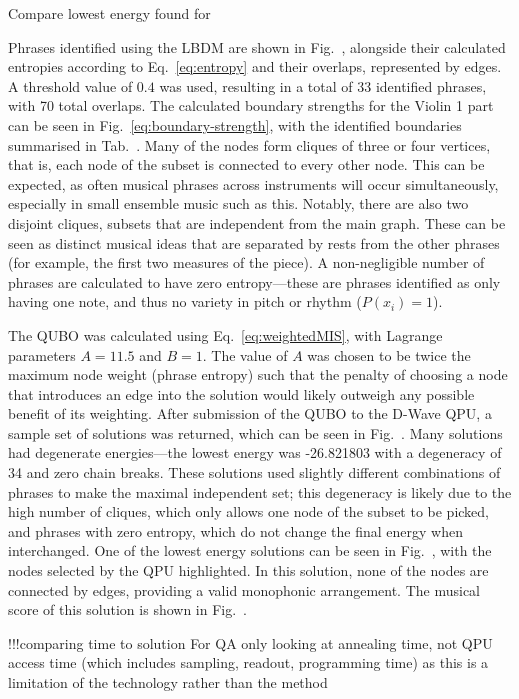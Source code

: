 \documentclass[12pt]{article}
\theoremstyle{definition}
\begin{document}
Compare lowest energy found for 

Phrases identified using the LBDM are shown in Fig.\  , alongside their calculated entropies according to Eq.\ \ref{eq:entropy} and their overlaps, represented by edges. A threshold value of $0.4$ was used, resulting in a total of 33 identified phrases, with 70 total overlaps. The calculated boundary strengths for the Violin 1 part can be seen in Fig.\ \ref{eq:boundary-strength}, with the identified boundaries summarised in Tab.\ . Many of the nodes form cliques of three or four vertices, that is, each node of the subset is connected to every other node. This can be expected, as often musical phrases across instruments will occur simultaneously, especially in small ensemble music such as this. Notably, there are also two disjoint cliques, subsets that are independent from the main graph. These can be seen as distinct musical ideas that are separated by rests from the other phrases (for example, the first two measures of the piece). A non-negligible number of phrases are calculated to have zero entropy—these are phrases identified as only having one note, and thus no variety in pitch or rhythm ($P(x_i)=1$).

The QUBO was calculated using Eq.\ \ref{eq:weightedMIS}, with Lagrange parameters $A=11.5$ and $B=1$. The value of $A$ was chosen to be twice the maximum node weight (phrase entropy) such that the penalty of choosing a node that introduces an edge into the solution would likely outweigh any possible benefit of its weighting. After submission of the QUBO to the D-Wave QPU, a sample set of solutions was returned, which can be seen in Fig.\  . Many solutions had degenerate energies—the lowest energy was -26.821803 with a degeneracy of 34 and zero chain breaks. These solutions used slightly different combinations of phrases to make the maximal independent set; this degeneracy is likely due to the high number of cliques, which only allows one node of the subset to be picked, and phrases with zero entropy, which do not change the final energy when interchanged. One of the lowest energy solutions can be seen in Fig.\  , with the nodes selected by the QPU highlighted. In this solution, none of the nodes are connected by edges, providing a valid monophonic arrangement. The musical score of this solution is shown in Fig.\  .

!!!comparing time to solution
For QA only looking at annealing time, not QPU access time (which includes sampling, readout, programming time) as this is a limitation of the technology rather than the method
\end{document}
